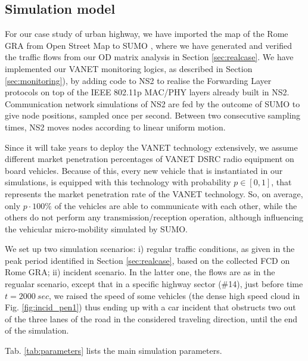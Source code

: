 \documentclass[conference]{IEEEtran}
\begin{document}
\subsection{Simulation model}


For our case study of urban highway, we have imported the map of the Rome GRA from Open Street Map \cite{openstreetmap} to SUMO \cite{SUMO}, where we have generated and verified the traffic flows from our OD matrix analysis in Section \ref{sec:realcase}. We have implemented our VANET monitoring logics, as described in Section \ref{sec:monitoring}), by adding code to NS2 \cite{ns2} to realise the Forwarding Layer protocols on top of the IEEE 802.11p MAC/PHY layers already built in NS2. Communication network simulations of NS2 are fed by the outcome of SUMO to give node positions, sampled once per second. Between two consecutive sampling times, NS2 moves nodes according to linear uniform motion.

Since it will take years to deploy the VANET technology extensively, we assume different market penetration percentages of VANET DSRC radio equipment on board vehicles. Because of this, every new vehicle that is instantiated in our simulations, is equipped with this technology with probability $p \in [0,1]$, that represents the market penetration rate of the VANET technology. So, on average, only $p\cdot 100\%$ of the vehicles are able to communicate with each other, while the others do not perform any transmission/reception operation, although influencing the vehicular micro-mobility simulated by SUMO.

We set up two simulation scenarios: i) regular traffic conditions, as given in the peak period identified in Section \ref{sec:realcase}, based on the collected FCD on Rome GRA; ii) incident scenario. In the latter one, the flows are as in the regualar  scenario, except that in a specific highway sector (\#14), just before time $t=2000~sec$, we raised the speed of some vehicles (the dense high speed cloud in Fig. \ref{fig:incid_pen1}) thus ending up with a car incident that obstructs two out of the three lanes of the road in the considered traveling direction, until the end of the simulation.

Tab. \ref{tab:parameters} lists the main simulation parameters.
\end{document}
